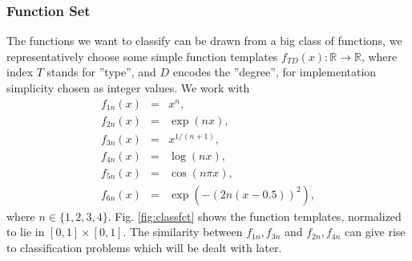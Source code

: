 \documentclass[useAMS,usenatbib]{mn2e}
\begin{document}
\subsubsection{Function Set}
The functions we want to classify can be drawn from a big class of
functions, we representatively choose some simple function templates
$f_{TD}(x):\mathbb{R}\to\mathbb{R}$, where index $T$ stands for
''type'', and $D$ encodes the ''degree'', for implementation
simplicity chosen as integer values. We work with
%
\begin{eqnarray}\label{eq:class}
  f_{1n}(x)&=&x^n,\\
  f_{2n}(x)&=&\exp(nx),\\
  f_{3n}(x)&=&x^{1/(n+1)},\\
  f_{4n}(x)&=&\log(nx),\\
  f_{5n}(x)&=&\cos(n\pi x),\\ 
  f_{6n}(x)&=&\exp(-(2n(x-0.5))^2),
\end{eqnarray}
%
where $n\in\{1,2,3,4\}$. Fig. \ref{fig:classfct} shows the function
templates, normalized to lie in $[0,1]\times[0,1]$. The similarity
between $f_{1n},f_{3n}$ and $f_{2n},f_{4n}$ can give rise to
classification problems which will be dealt with later.
\end{document}

